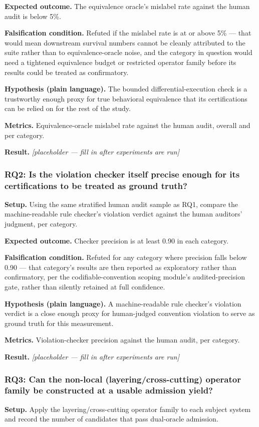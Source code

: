 \documentclass[11pt]{article}
\newcommand{\ph}{\textit{[placeholder --- fill in after experiments are run]}}
\begin{document}
\textbf{Expected outcome.} The equivalence oracle's mislabel rate against the human audit is below 5\%.

\textbf{Falsification condition.} Refuted if the mislabel rate is at or above 5\% --- that would mean downstream survival numbers cannot be cleanly attributed to the suite rather than to equivalence-oracle noise, and the category in question would need a tightened equivalence budget or restricted operator family before its results could be treated as confirmatory.

\textbf{Hypothesis (plain language).} The bounded differential-execution check is a trustworthy enough proxy for true behavioral equivalence that its certifications can be relied on for the rest of the study.

\textbf{Metrics.} Equivalence-oracle mislabel rate against the human audit, overall and per category.

\textbf{Result.} \ph

\subsubsection{RQ2: Is the violation checker itself precise enough for its certifications to be treated as ground truth?}
\textbf{Setup.} Using the same stratified human audit sample as RQ1, compare the machine-readable rule checker's violation verdict against the human auditors' judgment, per category.

\textbf{Expected outcome.} Checker precision is at least 0.90 in each category.

\textbf{Falsification condition.} Refuted for any category where precision falls below 0.90 --- that category's results are then reported as exploratory rather than confirmatory, per the codifiable-convention scoping module's audited-precision gate, rather than silently retained at full confidence.

\textbf{Hypothesis (plain language).} A machine-readable rule checker's violation verdict is a close enough proxy for human-judged convention violation to serve as ground truth for this measurement.

\textbf{Metrics.} Violation-checker precision against the human audit, per category.

\textbf{Result.} \ph

\subsubsection{RQ3: Can the non-local (layering/cross-cutting) operator family be constructed at a usable admission yield?}
\textbf{Setup.} Apply the layering/cross-cutting operator family to each subject system and record the number of candidates that pass dual-oracle admission.
\end{document}
